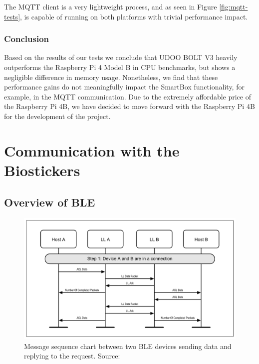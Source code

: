 The \acs{MQTT} client is a very lightweight process, and as seen in Figure \ref{fig:mqtt-tests}, is capable of running on both platforms with trivial performance impact.

\subsubsection{Conclusion}

Based on the results of our tests we conclude that UDOO BOLT V3 heavily outperforms the Raspberry Pi 4 Model B in CPU benchmarks, but shows a negligible difference in memory usage. Nonetheless, we find that these performance gains do not meaningfully impact the SmartBox functionality, for example, in the \acs{MQTT} communication. Due to the extremely affordable price of the Raspberry Pi 4B, we have decided to move forward with the Raspberry Pi 4B for the development of the project.

\section{Communication with the Biostickers}

\subsection{Overview of \acf{BLE}}

\begin{figure}[H]
    \centering
    \includegraphics[width=\linewidth]{images/ble-sending-data.PNG}
    \caption[Message sequence chart between two \acs{BLE} devices sending data and replying to the request.]{Message sequence chart between two \acs{BLE} devices sending data and replying to the request. Source: \cite{Specification1999}}
    \label{fig:differences-between-cloud-services}
\end{figure}


